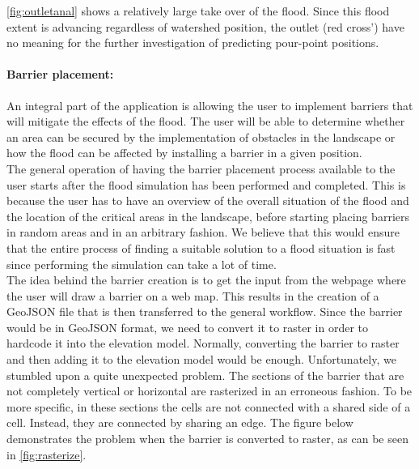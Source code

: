 \autoref{fig:outletanal} shows a relatively large take over of the flood. Since this flood extent is advancing regardless of watershed position, the outlet (red cross') have no meaning for the further investigation of predicting pour-point positions.


\paragraph{Barrier placement:} An integral part of the application is allowing the user to implement barriers that will mitigate the effects of the flood. The user will be able to determine whether an area can be secured by the implementation of obstacles in the landscape or how the flood can be affected by installing a barrier in a given position. \\
The general operation of having the barrier placement process available to the user starts after the flood simulation has been performed and completed. This is because the user has to have an overview of the overall situation of the flood and the location of the critical areas in the landscape, before starting placing barriers in random areas and in an arbitrary fashion. We believe that this would ensure that the entire process of finding a suitable solution to a flood situation is fast since performing the simulation can take a lot of time.\\

The idea behind the barrier creation is to get the input from the webpage where the user will draw a barrier on a web map. This results in the creation of a GeoJSON file that is then transferred to the general workflow. Since the barrier would be in GeoJSON format, we need to convert it to raster in order to hardcode it into the elevation model. Normally, converting the barrier to raster and then adding it to the elevation model would be enough. Unfortunately, we stumbled upon a quite unexpected problem. The sections of the barrier that are not completely vertical or horizontal are rasterized in an erroneous fashion. To be more specific, in these sections the cells are not connected with a shared side of a cell. Instead, they are connected by sharing an edge. The figure below demonstrates the problem when the barrier is converted to raster, as can be seen in \autoref{fig:rasterize}.\\

